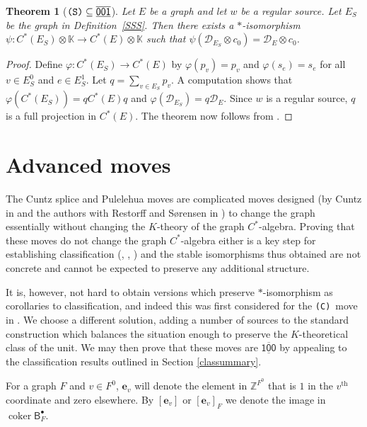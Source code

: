 \documentclass[12pt]{amsbook}%
\newcommand{\cok}{\operatorname{coker}}
\newcommand{\ee}{{\mathbf e}}
\renewcommand{\phi}{\varphi}
\newtheorem{theor}{Theorem}[section]
\theoremstyle{defin}
\theoremstyle{remark}
\numberwithin{equation}{chapter}
\numberwithin{theor}{section}
\newcommand{\K}{\mathbb{K}}
\newcommand{\ZZ}{\mathbb{Z}}
\newcommand{\xyzrel}[1]{\mbox{$\overline{\underline{\mathsf{ #1}}}$}}
\newcommand{\CCC}{\mbox{\texttt{\textup{(C)}}}}
\newcommand{\SSS}{\mbox{\texttt{\textup{(S)}}}}
\begin{document}
\begin{theor}[$\SSS\subseteq \xyzrel{001}$]\label{thm:source}
Let $E$ be a graph and let $w$ be a regular source. Let $E_S$ be the graph in Definition~\ref{SSS}.  Then there exists a $*$-isomorphism $\psi \colon C^*(E_S)\otimes\K \to C^*(E)\otimes \K$ such that $\psi ( \mathcal{D}_{E_S}\otimes c_0) = \mathcal{D}_E\otimes c_0$. 
\end{theor}



\begin{proof}
Define $\phi \colon C^*(E_S) \to C^*(E)$ by $\phi ( p_v ) = p_v$ and $\phi ( s_e ) = s_e$ for all $v \in E_S^0$ and $e \in E_S^1$.  Let $q = \sum_{ v \in E_S } p_v$.  A computation shows that $\phi ( C^*(E_S) ) = q C^*(E) q$ and $\phi ( \mathcal{D}_{E_S} ) = q \mathcal{D}_E$.  Since $w$ is a regular source, $q$ is a full projection in $C^*(E)$.  The theorem now follows from \cite[Theorem~3.2, Theorem~4.2, and Corollary~4.5]{tmceras:esigdsiga}.
\end{proof}





\section{Advanced moves}

The Cuntz splice and Pulelehua moves are complicated moves designed (by Cuntz in \cite{jc:cpco} and the authors with Restorff and S\o{}rensen in \cite{segrerapws:ccuggs}) to change the graph essentially without changing the $K$-theory of the graph $C^*$-algebra. Proving that these moves do not change the graph $C^*$-algebra either is a key step for establishing classification (\cite{mr:ccka}, \cite{segrerapws:ics}, \cite{segrerapws:ccuggs}) and the stable isomorphisms thus obtained are not concrete and cannot be expected to preserve any additional structure.

It is, however, not hard to obtain versions which preserve $*$-isomorphism as corollaries to classification, and indeed this was first considered for the \CCC\ move in \cite{km:sncswcoe}. We choose a different solution, adding a number of sources to the standard construction which balances the situation enough to preserve the $K$-theoretical class of the unit. We may then prove that these moves are \xyzrel{100} by appealing to the classification results outlined in Section \ref{classummary}.

For a graph $F$ and $v\in F^0$, $\ee_v$ will denote the element in $\ZZ^{F^0}$ that is $1$ in the $v^{\text{th}}$ coordinate and zero elsewhere. By $[\ee_v]$ or $[\ee_v]_F$ we denote the image in $\cok \mathsf{B}_F^\bullet$.
\end{document}
